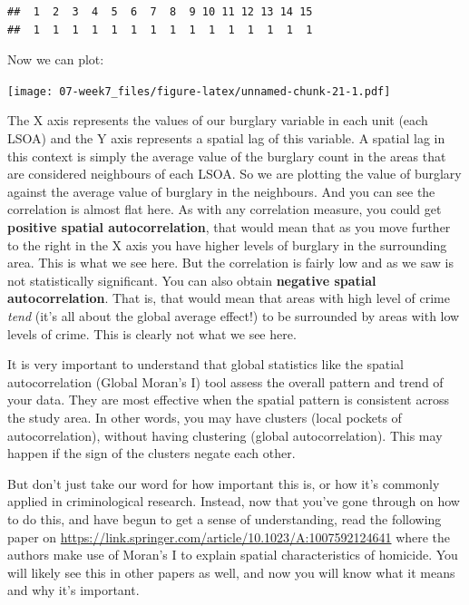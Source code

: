 \documentclass[]{book}
\newenvironment{Shaded}{\begin{snugshade}}{\end{snugshade}}
\newcommand{\KeywordTok}[1]{\textcolor[rgb]{0.13,0.29,0.53}{\textbf{#1}}}
\newcommand{\NormalTok}[1]{#1}
\newcommand{\OperatorTok}[1]{\textcolor[rgb]{0.81,0.36,0.00}{\textbf{#1}}}
\begin{document}
\begin{verbatim}
##  1  2  3  4  5  6  7  8  9 10 11 12 13 14 15 
##  1  1  1  1  1  1  1  1  1  1  1  1  1  1  1
\end{verbatim}

Now we can plot:

\begin{Shaded}
\end{Shaded}

\texttt{[image: 07-week7\_files/figure-latex/unnamed-chunk-21-1.pdf]}

The X axis represents the values of our burglary variable in each unit (each LSOA) and the Y axis represents a spatial lag of this variable. A spatial lag in this context is simply the average value of the burglary count in the areas that are considered neighbours of each LSOA. So we are plotting the value of burglary against the average value of burglary in the neighbours. And you can see the correlation is almost flat here. As with any correlation measure, you could get \textbf{positive spatial autocorrelation}, that would mean that as you move further to the right in the X axis you have higher levels of burglary in the surrounding area. This is what we see here. But the correlation is fairly low and as we saw is not statistically significant. You can also obtain \textbf{negative spatial autocorrelation}. That is, that would mean that areas with high level of crime \emph{tend} (it's all about the global average effect!) to be surrounded by areas with low levels of crime. This is clearly not what we see here.

It is very important to understand that global statistics like the spatial autocorrelation (Global Moran's I) tool assess the overall pattern and trend of your data. They are most effective when the spatial pattern is consistent across the study area. In other words, you may have clusters (local pockets of autocorrelation), without having clustering (global autocorrelation). This may happen if the sign of the clusters negate each other.

But don't just take our word for how important this is, or how it's commonly applied in criminological research. Instead, now that you've gone through on how to do this, and have begun to get a sense of understanding, read the following paper on \url{https://link.springer.com/article/10.1023/A:1007592124641} where the authors make use of Moran's I to explain spatial characteristics of homicide. You will likely see this in other papers as well, and now you will know what it means and why it's important.
\end{document}
